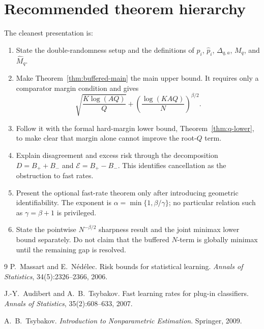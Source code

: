 \documentclass[11pt]{article}
\begin{document}
\section{Recommended theorem hierarchy}

The cleanest presentation is:
\begin{enumerate}[label=(\roman*)]
\item State the double-randomness setup and the definitions of $p_i$, $\widehat p_i$, $\Delta_{q,a}$, $M_q$, and $\widehat M_q$.

\item Make Theorem~\ref{thm:buffered-main} the main upper bound.  It requires only a comparator margin condition and gives
\[
\sqrt{\frac{K\log(AQ)}{Q}}
+
\left(\frac{\log(KAQ)}{N}\right)^{\beta/2}.
\]

\item Follow it with the formal hard-margin lower bound, Theorem~\ref{thm:q-lower}, to make clear that margin alone cannot improve the root-$Q$ term.

\item Explain disagreement and excess risk through the decomposition $D=B_++B_-$ and $\mathcal E=B_+-B_-$.  This identifies cancellation as the obstruction to fast rates.

\item Present the optional fast-rate theorem only after introducing geometric identifiability.  The exponent is $\alpha=\min\{1,\beta/\gamma\}$; no particular relation such as $\gamma=\beta+1$ is privileged.

\item State the pointwise $N^{-\beta/2}$ sharpness result and the joint minimax lower bound separately.  Do not claim that the buffered $N$-term is globally minimax until the remaining gap is resolved.
\end{enumerate}

\begin{thebibliography}{9}
P.~Massart and E.~N\'ed\'elec.
\newblock Risk bounds for statistical learning.
\newblock \emph{Annals of Statistics}, 34(5):2326--2366, 2006.

J.-Y.~Audibert and A.~B.~Tsybakov.
\newblock Fast learning rates for plug-in classifiers.
\newblock \emph{Annals of Statistics}, 35(2):608--633, 2007.

A.~B.~Tsybakov.
\newblock \emph{Introduction to Nonparametric Estimation}.
\newblock Springer, 2009.
\end{thebibliography}
\end{document}
